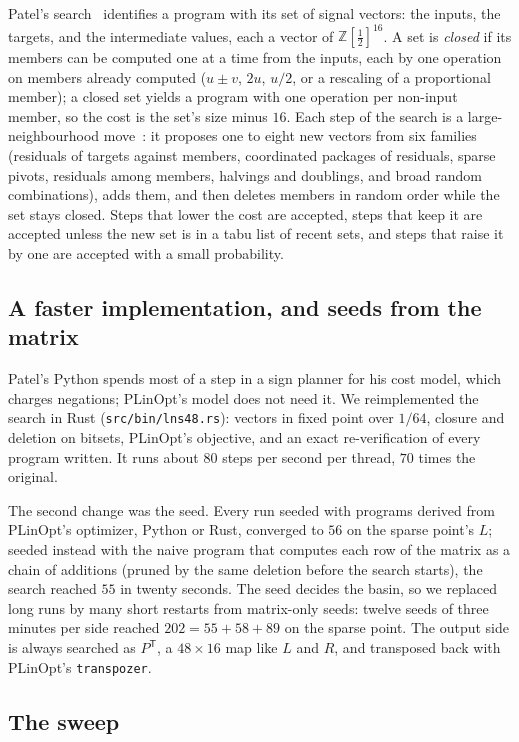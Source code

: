 \documentclass[11pt]{article}
\theoremstyle{remark}
\newcommand{\Z}{\mathbb{Z}}
\newcommand{\Zh}{\Z[\tfrac12]}
\newcommand{\Pt}{P^{\mathsf T}}
\begin{document}
Patel's search~\cite{Patel26} identifies a program with its set of
signal vectors: the inputs, the targets, and the intermediate values,
each a vector of $\Zh^{16}$.  A set is \emph{closed} if its members can
be computed one at a time from the inputs, each by one operation on
members already computed ($u\pm v$, $2u$, $u/2$, or a rescaling of a
proportional member); a closed set yields a program with one operation
per non-input member, so the cost is the set's size minus $16$.  Each step of the search is a large-neighbourhood
move~\cite{Shaw98}: it proposes one to eight new vectors from six
families (residuals of targets against members, coordinated packages of
residuals, sparse pivots, residuals among members, halvings and
doublings, and broad random combinations), adds them, and then deletes
members in random order while the set stays closed.  Steps that lower
the cost are accepted, steps that keep it are accepted unless the new
set is in a tabu list of recent sets, and steps that raise it by one are
accepted with a small probability.

\subsection{A faster implementation, and seeds from the matrix}

Patel's Python spends most of a step in a sign planner for his cost
model, which charges negations; PLinOpt's model does not need it.  We
reimplemented the search in Rust (\texttt{src/bin/lns48.rs}): vectors in
fixed point over $1/64$, closure and deletion on bitsets, PLinOpt's
objective, and an exact re-verification of every program written.  It
runs about $80$ steps per second per thread, $70$ times the original.

The second change was the seed.  Every run seeded with programs derived
from PLinOpt's optimizer, Python or Rust, converged to $56$ on the
sparse point's $L$; seeded instead with the naive program that computes each
row of the matrix as a chain of additions (pruned by the same deletion
before the search starts), the search reached $55$ in twenty seconds.
The seed decides the basin, so we replaced long runs by many short
restarts from matrix-only seeds: twelve seeds of three minutes per side
reached $202=55+58+89$ on the sparse point.  The output side is always
searched as $\Pt$, a $48\times16$ map like $L$ and $R$, and transposed
back with PLinOpt's \texttt{transpozer}.

\subsection{The sweep}
\end{document}
